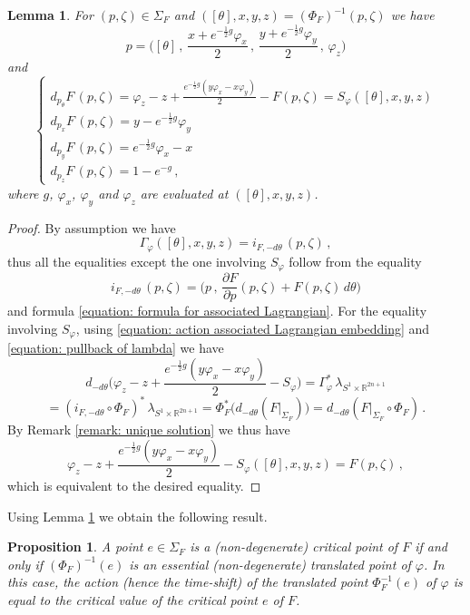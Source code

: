 \documentclass{amsart}
\newtheorem{prop}[thm]{Proposition}
\newtheorem{lemma}[thm]{Lemma}
\theoremstyle{remark}
\begin{document}
\begin{lemma}\label{lemma: bijection critical points explicit}
For $(p, \zeta) \in \Sigma_F$
and $([\theta], x, y, z) = (\Phi_F)^{-1} (p, \zeta)$
we have
\[
p = \Big( [\theta] \,,\, \frac{x + e^{-\frac{1}{2}g} \varphi_x }{2} \,,\,
\frac{y + e^{-\frac{1}{2}g} \varphi_y }{2} \,,\, \varphi_z \Big)
\]
and
\[
\begin{cases}
d_{p_{\theta}} F \, (p, \zeta)
= \varphi_z - z + \frac{ e^{- \frac{1}{2}g} (y \varphi_x - x \varphi_y) }{2} - F(p, \zeta)
= S_{\varphi} ([\theta], x, y, z) \\
d_{p_x} F \, (p, \zeta) = y - e^{-\frac{1}{2}g} \varphi_y \\
d_{p_y} F \, (p, \zeta) = e^{-\frac{1}{2}g} \varphi_x - x \\
d_{p_z} F \, (p, \zeta) = 1 - e^{-g} \,,
\end{cases}
\]
where $g$, $\varphi_x$, $\varphi_y$ and $\varphi_z$
are evaluated at $([\theta], x, y, z)$.
\end{lemma}

\begin{proof}
By assumption we have
\[
\Gamma_{\varphi} ([\theta], x, y, z) = i_{F, -d\theta} \, (p, \zeta) \,,
\]
thus all the equalities
except the one involving $S_{\varphi}$
follow from the equality
\[
i_{F, -d\theta} \, (p, \zeta) =
\Big( p \,,\, \frac{\partial F}{\partial p} (p, \zeta) + F(p, \zeta) \, d\theta \Big)
\]
and formula \eqref{equation: formula for associated Lagrangian}.
For the equality involving $S_{\varphi}$,
using \eqref{equation: action associated Lagrangian embedding}
and \eqref{equation: pullback of lambda}
we have
\[
d_{-d\theta}
\Big( \varphi_z - z + \frac{ e^{- \frac{1}{2}g} (y \varphi_x - x \varphi_y) }{2} - S_{\varphi} \Big)
= \Gamma_{\varphi}^{\ast} \, \lambda_{S^1 \times \mathbb{R}^{2n+1}}
\]
\[
= ( i_{F, -d\theta} \circ \Phi_F )^{\ast} \, \lambda_{S^1 \times \mathbb{R}^{2n+1}}
= \Phi_F^{\ast} \big( d_{-d\theta} (\left. F \right\lvert_{\Sigma_F}) \big)
= d_{-d\theta} (\left. F \right\lvert_{\Sigma_F} \circ \Phi_F) \,.
\]
By Remark \ref{remark: unique solution} we thus have
\[
\varphi_z - z + \frac{ e^{- \frac{1}{2}g} (y \varphi_x - x \varphi_y) }{2}
- S_{\varphi} ([\theta], x, y, z)
= F(p, \zeta) \,,
\]
which is equivalent to the desired equality.
\end{proof}

Using Lemma \ref{lemma: bijection critical points explicit}
we obtain the following result.

\begin{prop}\label{proposition: bijection critical points F translated point varphi}
A point $e \in \Sigma_F$ is a (non-degenerate) critical point of $F$
if and only if $(\Phi_F)^{-1} (e)$ is an essential
(non-degenerate) translated point of $\varphi$.
In this case,
the action (hence the time-shift)
of the translated point $\Phi_F^{-1} (e)$ of $\varphi$
is equal to the critical value of the critical point $e$ of $F$.
\end{prop}
\end{document}
